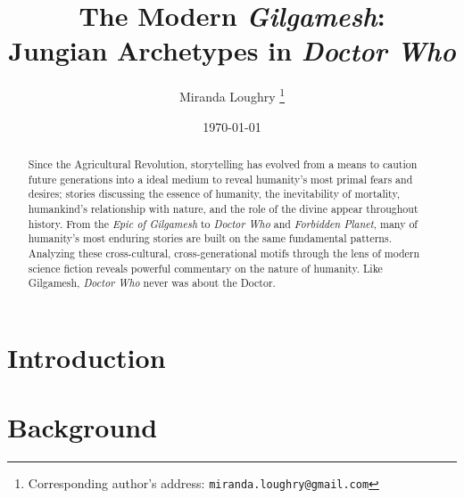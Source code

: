 \documentclass[10pt,a4paper]{article}
\begin{document}
\title{The Modern \emph{Gilgamesh}: \\
Jungian Archetypes in \emph{Doctor Who}}

\author{Miranda Loughry%
\thanks{Corresponding author's address: \texttt{miranda.loughry@gmail.com}}}

\date{\today}

\maketitle

\begin{abstract}
Since the Agricultural Revolution, storytelling has evolved from a means to caution future generations into a ideal medium to reveal humanity's most primal fears and desires; stories discussing the essence of humanity, the inevitability of mortality, humankind's
relationship with nature, and the role of the
divine appear throughout history. From the
\emph{Epic of Gilgamesh} to \emph{Doctor Who}
and \emph{Forbidden Planet}, many of humanity's
most enduring stories are built on the same
fundamental patterns. Analyzing these
cross-cultural, cross-generational motifs
through the lens of modern science fiction
reveals powerful commentary on the nature of
humanity. Like Gilgamesh, \emph{Doctor Who}
never was about the Doctor.
\end{abstract}

\section{Introduction}
%
%

\section{Background}
\end{document}
